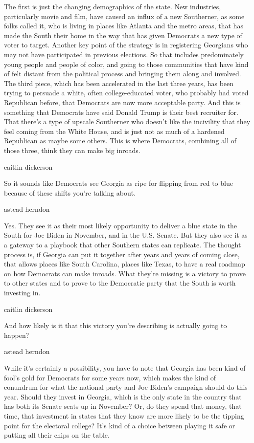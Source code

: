 The first is just the changing demographics of the state. New
industries, particularly movie and film, have caused an influx of a new
Southerner, as some folks called it, who is living in places like
Atlanta and the metro areas, that has made the South their home in the
way that has given Democrats a new type of voter to target. Another key
point of the strategy is in registering Georgians who may not have
participated in previous elections. So that includes predominately young
people and people of color, and going to those communities that have
kind of felt distant from the political process and bringing them along
and involved. The third piece, which has been accelerated in the last
three years, has been trying to persuade a white, often college-educated
voter, who probably had voted Republican before, that Democrats are now
more acceptable party. And this is something that Democrats have said
Donald Trump is their best recruiter for. That there's a type of upscale
Southerner who doesn't like the incivility that they feel coming from
the White House, and is just not as much of a hardened Republican as
maybe some others. This is where Democrats, combining all of those
three, think they can make big inroads.

caitlin dickerson

So it sounds like Democrats see Georgia as ripe for flipping from red to
blue because of these shifts you're talking about.

astead herndon

Yes. They see it as their most likely opportunity to deliver a blue
state in the South for Joe Biden in November, and in the U.S. Senate.
But they also see it as a gateway to a playbook that other Southern
states can replicate. The thought process is, if Georgia can put it
together after years and years of coming close, that allows places like
South Carolina, places like Texas, to have a real roadmap on how
Democrats can make inroads. What they're missing is a victory to prove
to other states and to prove to the Democratic party that the South is
worth investing in.

caitlin dickerson

And how likely is it that this victory you're describing is actually
going to happen?

astead herndon

While it's certainly a possibility, you have to note that Georgia has
been kind of fool's gold for Democrats for some years now, which makes
the kind of conundrum for what the national party and Joe Biden's
campaign should do this year. Should they invest in Georgia, which is
the only state in the country that has both its Senate seats up in
November? Or, do they spend that money, that time, that investment in
states that they know are more likely to be the tipping point for the
electoral college? It's kind of a choice between playing it safe or
putting all their chips on the table.

